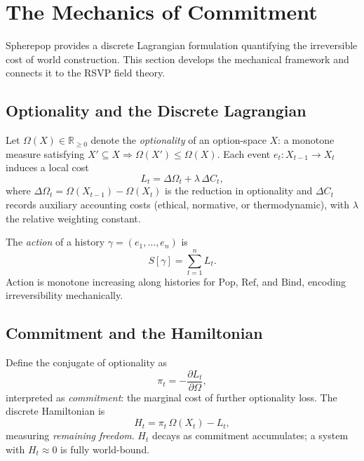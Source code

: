 \documentclass[12pt, a4paper]{article}
\theoremstyle{definition}
\theoremstyle{remark}
\newcommand{\Rnn}{\mathbb{R}_{\ge 0}}
\newcommand{\Pop}{\mathrm{Pop}}
\newcommand{\Refuse}{\mathrm{Ref}}
\newcommand{\Bind}{\mathrm{Bind}}
\begin{document}
\section{The Mechanics of Commitment}
\label{sec:mechanics}

Spherepop provides a discrete Lagrangian formulation quantifying the irreversible cost
of world construction. This section develops the mechanical
framework and connects it to the RSVP field theory.

\subsection{Optionality and the Discrete Lagrangian}

Let $\Omega(X) \in \Rnn$ denote the \emph{optionality} of an option-space $X$: a
monotone measure satisfying $X' \subseteq X \Rightarrow \Omega(X') \le \Omega(X)$.
Each event $e_t : X_{t-1} \to X_t$ induces a local cost
\begin{equation}
  L_t = \Delta\Omega_t + \lambda\,\Delta C_t,
  \label{eq:lagrangian}
\end{equation}
where $\Delta\Omega_t = \Omega(X_{t-1}) - \Omega(X_t)$ is the reduction in optionality
and $\Delta C_t$ records auxiliary accounting costs (ethical, normative, or
thermodynamic), with $\lambda$ the relative weighting constant.

The \emph{action} of a history $\gamma = (e_1,\ldots,e_n)$ is
\begin{equation}
  S[\gamma] = \sum_{t=1}^n L_t.
  \label{eq:action}
\end{equation}
Action is monotone increasing along histories for $\Pop$, $\Refuse$, and $\Bind$,
encoding irreversibility mechanically.

\subsection{Commitment and the Hamiltonian}

Define the conjugate of optionality as
\begin{equation}
  \pi_t = -\frac{\partial L_t}{\partial\Omega},
  \label{eq:commitment}
\end{equation}
interpreted as \emph{commitment}: the marginal cost of further optionality loss. The
discrete Hamiltonian is
\begin{equation}
  H_t = \pi_t\,\Omega(X_t) - L_t,
  \label{eq:hamiltonian}
\end{equation}
measuring \emph{remaining freedom}. $H_t$ decays as commitment accumulates; a system
with $H_t \approx 0$ is fully world-bound.
\end{document}
